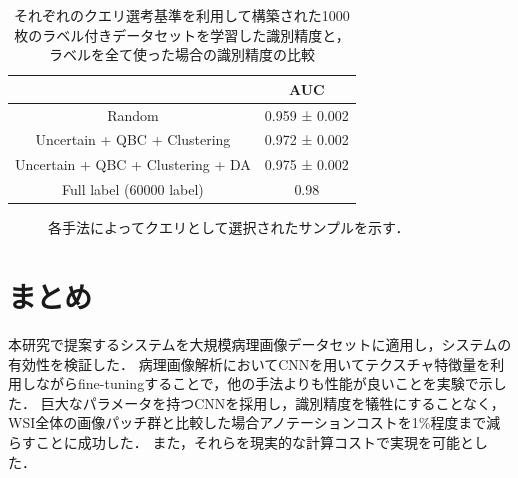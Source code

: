 \begin{table}[h]
  \caption{\label{table:camelyon_last_accuracy}それぞれのクエリ選考基準を利用して構築された1000枚のラベル付きデータセットを学習した識別精度と，ラベルを全て使った場合の識別精度の比較}
  \center
  \begin{tabular}{c|c} 
       &  AUC \\ \hline
      Random & 0.959 ± 0.002  \\
      Uncertain + QBC + Clustering & 0.972 ± 0.002  \\ 
      Uncertain + QBC + Clustering + DA & 0.975 ± 0.002  \\ \hline
      Full label (60000 label) & 0.98
  \end{tabular}
\end{table}

\begin{figure}[hbp]
  \begin{center}

  \caption{\label{figure:camelyon_query_examples}各手法によってクエリとして選択されたサンプルを示す．}
  \end{center}
\end{figure}


\section{まとめ}
本研究で提案するシステムを大規模病理画像データセットに適用し，システムの有効性を検証した．
病理画像解析においてCNNを用いてテクスチャ特徴量を利用しながらfine-tuningすることで，他の手法よりも性能が良いことを実験で示した．
巨大なパラメータを持つCNNを採用し，識別精度を犠牲にすることなく，WSI全体の画像パッチ群と比較した場合アノテーションコストを1$\%$程度まで減らすことに成功した．
また，それらを現実的な計算コストで実現を可能とした．
